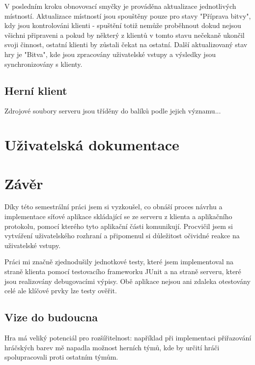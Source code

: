 \documentclass[12pt,a4paper]{article}
\let\oldsection\section
\renewcommand\section{\clearpage\oldsection}
\begin{document}
V posledním kroku obnovovací smyčky je prováděna aktualizace jednotlivých místností. Aktualizace místností jsou spouštěny pouze pro stavy "Příprava bitvy", kdy jsou kontrolováni klienti - spuštění totiž nemůže proběhnout dokud nejsou všichni připraveni a pokud by některý z klientů v tomto stavu nečekaně ukončil svoji činnost, ostatní klienti by zůstali čekat na ostatní. Další aktualizovaný stav hry je "Bitva", kde jsou zpracovány uživatelské vstupy a výsledky jsou synchronizovány s klienty.

\subsection{Herní klient}
Zdrojové soubory serveru jsou tříděny do balíků podle jejich významu...
\section{Uživatelská dokumentace}

\section{Závěr}
Díky této semestrální práci jsem si vyzkoušel, co obnáší proces návrhu a implementace síťové aplikace skládající se ze serveru z klienta a aplikačního protokolu, pomocí kterého tyto aplikační části komunikují.
Procvičil jsem si vytváření uživatelského rozhraní a připomenul si důležitost očividné reakce na uživatelské vstupy.

Práci mi značně zjednodušily jednotkové testy, které jsem implementoval na straně klienta pomocí testovacího frameworku JUnit a na straně serveru, které jsou realizovány debugovacími výpisy. Obě aplikace nejsou ani zdaleka otestovány celé ale klíčové prvky lze testy ověřit.

\subsection{Vize do budoucna}
Hra má veliký potenciál pro rozšířitelnost: například při implementaci přiřazování hráčských barev mě napadla možnost herních týmů, kde by určití hráči spolupracovali proti ostatním týmům.
\end{document}
